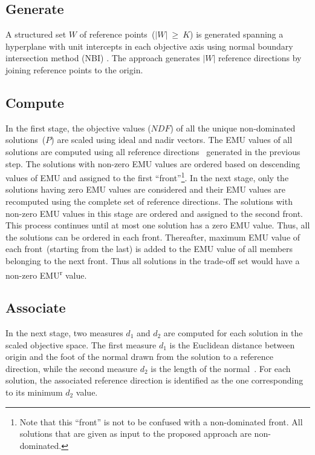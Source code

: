 \subsection{Generate} A structured set $W$ of reference points~($|W|~\ge~K$) is generated spanning a hyperplane with unit intercepts in each objective axis using normal boundary intersection method (NBI) \cite{das1998normal}. The approach generates $|W|$ reference directions by joining reference points to the origin.

\subsection{Compute} In the first stage, the objective values ($NDF$) of all the unique non-dominated solutions~($P$) are scaled using ideal and nadir vectors. The EMU values of all solutions are computed using all reference directions~\cite{branke2004finding} generated in the previous step. The solutions with non-zero EMU values are ordered based on descending values of EMU and assigned to the first ``front''\footnote{Note that this ``front'' is not to be confused with a non-dominated front. All solutions that are given as input to the proposed approach are non-dominated.}. In the next stage, only the solutions having zero EMU values are considered and their EMU values are recomputed using the complete set of reference directions. The solutions with non-zero EMU values in this stage are ordered and assigned to the second front. This process continues until at most one solution has a zero EMU value. Thus, all the solutions can be ordered in each front. Thereafter, maximum EMU value of each front~(starting from the last) is added to the EMU value of all members belonging to the next front. Thus all solutions in the trade-off set would have a non-zero EMU\textsuperscript{r} value.

\subsection{Associate} In the next stage, two measures $d_1$ and $d_2$ are computed for each solution in the scaled objective space. The first measure $d_1$ is the Euclidean distance between origin and the foot of the normal drawn from the solution to a reference direction, while the second measure $d_2$ is the length of the normal~\cite{asafuddoula2014decomposition}. For each solution, the associated reference direction is identified as the one corresponding to its minimum $d_2$ value. 

